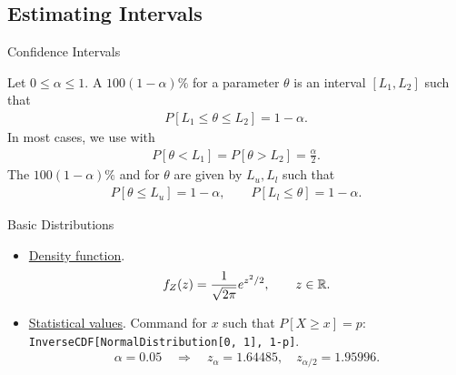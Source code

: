 \subsection{Estimating Intervals}

\begin{frame}{Confidence Intervals}

\justifying
{} Let $0\leq \alpha \leq 1$. A $100(1-\alpha)\%$  for a parameter $\theta$ is an interval $[L_1, L_2]$ such that
\begin{align*}
P[L_1\leq \theta\leq L_2] = 1 - \alpha.
\end{align*}
In most cases, we use  with
\begin{align*}
P[\theta < L_1] = P[\theta > L_2] = \frac{\alpha}{2}.
\end{align*}
The $100(1-\alpha)\%$  and  for $\theta$ are given by $L_u, L_l$ such that
\begin{align*}
P[\theta \leq L_u] = 1 - \alpha, \qquad P[L_l \leq \theta] = 1 - \alpha.
\end{align*}

\end{frame}


\begin{frame}{Basic Distributions}

\begin{itemize}
	\justifying
	\item \underline{Density function}.
	\begin{align*}
	f_Z(z) = \frac{1}{\sqrt{2\pi}}e^{z^2/2}, \qquad z\in \mathbb{R}.
	\end{align*}
	\item \underline{Statistical values}. Command for $x$ such that $P[X\geq x] = p$: \\
	\texttt{InverseCDF[NormalDistribution[0, 1], 1-p]}.
	\begin{align*}
	\alpha = 0.05 \quad \Rightarrow \quad z_{\alpha} = 1.64485, \quad z_{\alpha/2} = 1.95996.
	\end{align*}
\end{itemize}

\end{frame}


